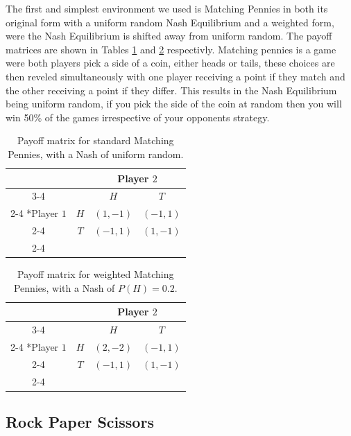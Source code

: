 \documentclass[conference]{IEEEtran}
\begin{document}
The first and simplest environment we used is Matching Pennies in both its original form with a uniform random Nash Equilibrium and a weighted form, were the Nash Equilibrium is shifted away from uniform random. The payoff matrices are shown in Tables \ref{tab:stock-mp} and \ref{tab:weighted-mp} respectivly. 
Matching pennies is a game were both players pick a side of a coin, either heads or tails, these choices are then reveled simultaneously with one player receiving a point if they match and the other receiving a point if they differ. This results in the Nash Equilibrium being uniform random, if you pick the side of the coin at random then you will win 50\% of the games irrespective of your opponents strategy.

\begin{table}
    \centering
    \setlength{\extrarowheight}{2pt}
    \begin{tabular}{*{4}{c|}}
      \multicolumn{2}{c}{} & \multicolumn{2}{c}{Player $2$}\\\cline{3-4}
      \multicolumn{1}{c}{} &  & $H$  & $T$ \\\cline{2-4}
      \multirow{2}*{Player $1$}  & $H$ & $(1,-1)$ & $(-1,1)$ \\\cline{2-4}
      & $T$ & $(-1,1)$ & $(1,-1)$ \\\cline{2-4}
    \end{tabular}
    \caption{Payoff matrix for standard Matching Pennies, with a Nash of uniform random.}
    \label{tab:stock-mp}
\end{table}

\begin{table}
    \centering
    \setlength{\extrarowheight}{2pt}
    \begin{tabular}{*{4}{c|}}
      \multicolumn{2}{c}{} & \multicolumn{2}{c}{Player $2$}\\\cline{3-4}
      \multicolumn{1}{c}{} &  & $H$  & $T$ \\\cline{2-4}
      \multirow{2}*{Player $1$}  & $H$ & $(2,-2)$ & $(-1,1)$ \\\cline{2-4}
      & $T$ & $(-1,1)$ & $(1,-1)$ \\\cline{2-4}
    \end{tabular}
    \caption{Payoff matrix for weighted Matching Pennies, with a Nash of $P(H)=0.2$.}
    \label{tab:weighted-mp}
\end{table}

\subsection{Rock Paper Scissors}
\end{document}
